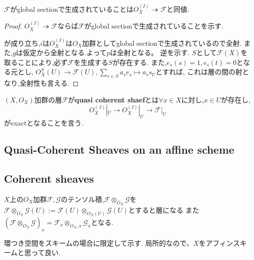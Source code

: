 \begin{lem}
 $\mathcal{F}$がglobal sectionで生成されていることは$O_X^(I) \twoheadrightarrow \mathcal{F}$と同値.
\end{lem}
\begin{proof}
$O_X^(I) \twoheadrightarrow \mathcal{F}$ならば$\mathcal{F}$がglobal sectionで生成されていることを示す.


が成り立ち,$i$は$O_X^{(I)}$は$O_X$加群としてglobal sectionで生成されているので全射.
また,$g$は仮定から全射となる.よって$p$は全射となる。
逆を示す.
$S$として$\mathcal{F}(X)$を取ることにより,必ず$\mathcal{F}$を生成する$S$が存在する.
また,$e_s(s) = 1, e_s(t) = 0$となる元とし,
$O_X^{S}(U) \to \mathcal{F}(U), \sum_{s \in S} a_s e_s \mapsto a_s s_U$とすれば,
これは層の間の射となり,全射性も言える.
\end{proof}


\begin{screen}
\begin{dfn}
$(X, O_X)$加群の層$\mathcal{F}$が\textbf{quasi coherent shaef}とは$\forall x \in X$に対し,$x \in U$が存在し,
\begin{equation*}
  O_X^{(J)}|_U \to O_X^{(I)}|_U \to \mathcal{F}|_U
\end{equation*}
がexactとなることを言う.
\end{dfn}
\end{screen}

\subsection{Quasi-Coherent Sheaves on an affine scheme}

\subsection{Coherent sheaves}


\begin{lem}
\label{tensor module}
$X$上の$O_X$加群$\mathcal{F},\mathcal{G}$のテンソル積,$\mathcal{F} \otimes_{O_X} \mathcal{G}$を
$\mathcal{F} \otimes_{O_X} \mathcal{G}(U) := \mathcal{F}(U) \otimes_{O_X(U)} \mathcal{G}(U)$とすると層になる
また$(\mathcal{F} \otimes_{O_X} \mathcal{G})_x = \mathcal{F}_x \otimes_{O_X, x} \mathcal{G}_x$となる.
\end{lem}
環つき空間をスキームの場合に限定して示す. 局所的なので、$X$をアフィンスキームと思って良い.

